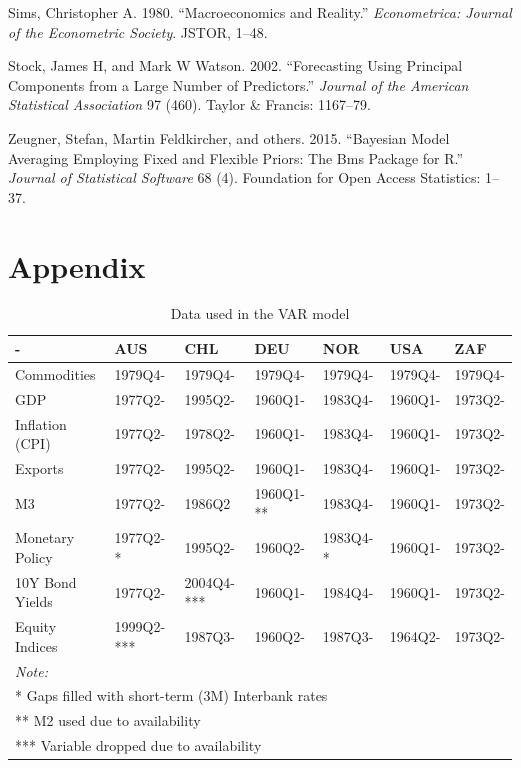 \documentclass[12pt,]{article}
\begin{document}
\hypertarget{ref-sims1980macroeconomics}{}
Sims, Christopher A. 1980. ``Macroeconomics and Reality.''
\emph{Econometrica: Journal of the Econometric Society}. JSTOR, 1--48.

\hypertarget{ref-stock2002forecasting}{}
Stock, James H, and Mark W Watson. 2002. ``Forecasting Using Principal
Components from a Large Number of Predictors.'' \emph{Journal of the
American Statistical Association} 97 (460). Taylor \& Francis: 1167--79.

\hypertarget{ref-zeugner2015bayesian}{}
Zeugner, Stefan, Martin Feldkircher, and others. 2015. ``Bayesian Model
Averaging Employing Fixed and Flexible Priors: The Bms Package for R.''
\emph{Journal of Statistical Software} 68 (4). Foundation for Open
Access Statistics: 1--37.

\section{Appendix}\label{appendix}

\begin{table}[!h]

\caption{\label{tab:unnamed-chunk-2}Data used in the VAR model}
\centering
\begin{tabular}[t]{l|l|l|l|l|l|l}
\hline
- & AUS & CHL & DEU & NOR & USA & ZAF\\
\hline
Commodities & 1979Q4- & 1979Q4- & 1979Q4- & 1979Q4- & 1979Q4- & 1979Q4-\\
\hline
GDP & 1977Q2- & 1995Q2- & 1960Q1- & 1983Q4- & 1960Q1- & 1973Q2-\\
\hline
Inflation (CPI) & 1977Q2- & 1978Q2- & 1960Q1- & 1983Q4- & 1960Q1- & 1973Q2-\\
\hline
Exports & 1977Q2- & 1995Q2- & 1960Q1- & 1983Q4- & 1960Q1- & 1973Q2-\\
\hline
M3 & 1977Q2- & 1986Q2 & 1960Q1- ** & 1983Q4- & 1960Q1- & 1973Q2-\\
\hline
Monetary Policy & 1977Q2- * & 1995Q2- & 1960Q2- & 1983Q4- * & 1960Q1- & 1973Q2-\\
\hline
10Y Bond Yields & 1977Q2- & 2004Q4- *** & 1960Q1- & 1984Q4- & 1960Q1- & 1973Q2-\\
\hline
Equity Indices & 1999Q2- *** & 1987Q3- & 1960Q2- & 1987Q3- & 1964Q2- & 1973Q2-\\
\hline
\multicolumn{7}{l}{\textit{Note: }}\\
\multicolumn{7}{l}{* Gaps filled with short-term (3M) Interbank rates}\\
\multicolumn{7}{l}{** M2 used due to availability}\\
\multicolumn{7}{l}{*** Variable dropped due to availability}\\
\end{tabular}
\end{table}
\end{document}
